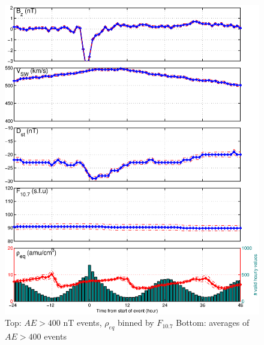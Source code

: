 \documentclass[10pt,twocolumn]{article}
\begin{document}
\begin{figure}[htp!]
\includegraphics[scale=0.35]{paperfigures/stormavs-AE.eps}
\caption{Top: $AE > 400$ nT events, $\rho_{eq}$ binned by $F_{10.7}$ Bottom: averages of $AE > 400$ events}
\end{figure}
\hfill
\end{document}
